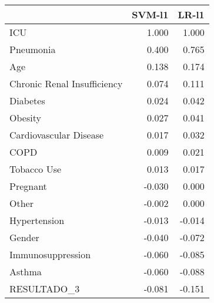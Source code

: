 \begin{tabular}{lrr}
\toprule
{} &  SVM-l1 &  LR-l1 \\
\midrule
ICU                         &   1.000 &  1.000 \\
Pneumonia                   &   0.400 &  0.765 \\
Age                         &   0.138 &  0.174 \\
Chronic Renal Insufficiency &   0.074 &  0.111 \\
Diabetes                    &   0.024 &  0.042 \\
Obesity                     &   0.027 &  0.041 \\
Cardiovascular Disease      &   0.017 &  0.032 \\
COPD                        &   0.009 &  0.021 \\
Tobacco Use                 &   0.013 &  0.017 \\
Pregnant                    &  -0.030 &  0.000 \\
Other                       &  -0.002 &  0.000 \\
Hypertension                &  -0.013 & -0.014 \\
Gender                      &  -0.040 & -0.072 \\
Immunosuppression           &  -0.060 & -0.085 \\
Asthma                      &  -0.060 & -0.088 \\
RESULTADO\_3                 &  -0.081 & -0.151 \\
\bottomrule
\end{tabular}
